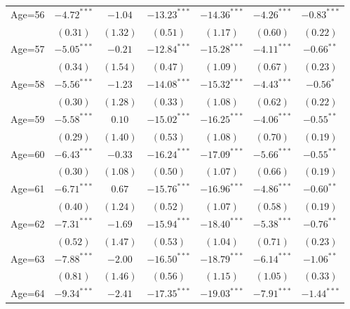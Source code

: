 \documentclass[fullpage]{paper}
\begin{document}
\begin{center}
\begin{longtable}{l c c c c c c }
Age=56      & $-4.72^{***}$ & $-1.04$       & $-13.23^{***}$ & $-14.36^{***}$ & $-4.26^{***}$ & $-0.83^{***}$ \\
            & $(0.31)$      & $(1.32)$      & $(0.51)$       & $(1.17)$       & $(0.60)$      & $(0.22)$      \\
Age=57      & $-5.05^{***}$ & $-0.21$       & $-12.84^{***}$ & $-15.28^{***}$ & $-4.11^{***}$ & $-0.66^{**}$  \\
            & $(0.34)$      & $(1.54)$      & $(0.47)$       & $(1.09)$       & $(0.67)$      & $(0.23)$      \\
Age=58      & $-5.56^{***}$ & $-1.23$       & $-14.08^{***}$ & $-15.32^{***}$ & $-4.43^{***}$ & $-0.56^{*}$   \\
            & $(0.30)$      & $(1.28)$      & $(0.33)$       & $(1.08)$       & $(0.62)$      & $(0.22)$      \\
Age=59      & $-5.58^{***}$ & $0.10$        & $-15.02^{***}$ & $-16.25^{***}$ & $-4.06^{***}$ & $-0.55^{**}$  \\
            & $(0.29)$      & $(1.40)$      & $(0.53)$       & $(1.08)$       & $(0.70)$      & $(0.19)$      \\
Age=60      & $-6.43^{***}$ & $-0.33$       & $-16.24^{***}$ & $-17.09^{***}$ & $-5.66^{***}$ & $-0.55^{**}$  \\
            & $(0.30)$      & $(1.08)$      & $(0.50)$       & $(1.07)$       & $(0.66)$      & $(0.19)$      \\
Age=61      & $-6.71^{***}$ & $0.67$        & $-15.76^{***}$ & $-16.96^{***}$ & $-4.86^{***}$ & $-0.60^{**}$  \\
            & $(0.40)$      & $(1.24)$      & $(0.52)$       & $(1.07)$       & $(0.58)$      & $(0.19)$      \\
Age=62      & $-7.31^{***}$ & $-1.69$       & $-15.94^{***}$ & $-18.40^{***}$ & $-5.38^{***}$ & $-0.76^{**}$  \\
            & $(0.52)$      & $(1.47)$      & $(0.53)$       & $(1.04)$       & $(0.71)$      & $(0.23)$      \\
Age=63      & $-7.88^{***}$ & $-2.00$       & $-16.50^{***}$ & $-18.79^{***}$ & $-6.14^{***}$ & $-1.06^{**}$  \\
            & $(0.81)$      & $(1.46)$      & $(0.56)$       & $(1.15)$       & $(1.05)$      & $(0.33)$      \\
Age=64      & $-9.34^{***}$ & $-2.41$       & $-17.35^{***}$ & $-19.03^{***}$ & $-7.91^{***}$ & $-1.44^{***}$ \\

\end{longtable}
\end{center}
\end{document}
